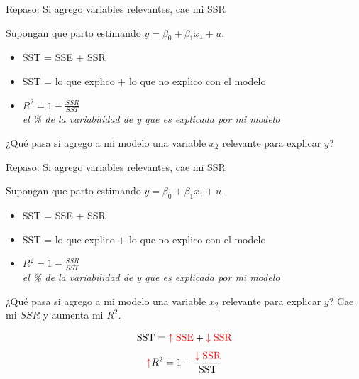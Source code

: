 \documentclass{beamer}
\begin{document}
\begin{frame}{Repaso: Si agrego variables relevantes, cae mi SSR}

    Supongan que parto estimando $y = \beta_0 + \beta_1 x_1 + u$.
    \begin{itemize}
        \item SST = SSE + SSR
        \item SST = lo que explico + lo que no explico con el modelo
        \item $R^2 = 1 - \frac{SSR}{SST}$ \\ 
        \quad \textit{el \% de la variabilidad de y que es explicada por mi modelo}
    \end{itemize}

    ¿Qué pasa si agrego a mi modelo una variable $x_2$ relevante para explicar $y$?
\end{frame}

\begin{frame}{Repaso: Si agrego variables relevantes, cae mi SSR}

    Supongan que parto estimando $y = \beta_0 + \beta_1 x_1 + u$.
    \begin{itemize}
        \item SST = SSE + SSR
        \item SST = lo que explico + lo que no explico con el modelo
        \item $R^2 = 1 - \frac{SSR}{SST}$ \\ 
        \quad \textit{el \% de la variabilidad de y que es explicada por mi modelo}
    \end{itemize}

    ¿Qué pasa si agrego a mi modelo una variable $x_2$ relevante para explicar $y$? Cae mi $SSR$ y aumenta mi $R^2$.

\[ \text{SST} = \textcolor{red}{\uparrow \text{SSE}} + \textcolor{red}{\downarrow \text{SSR}} \]
\vspace{0.25cm}
\[ \textcolor{red}{\uparrow} R^2 = 1 - \frac{\textcolor{red}{\downarrow \text{SSR}}}{\text{SST}} \]

\end{frame}
\end{document}
